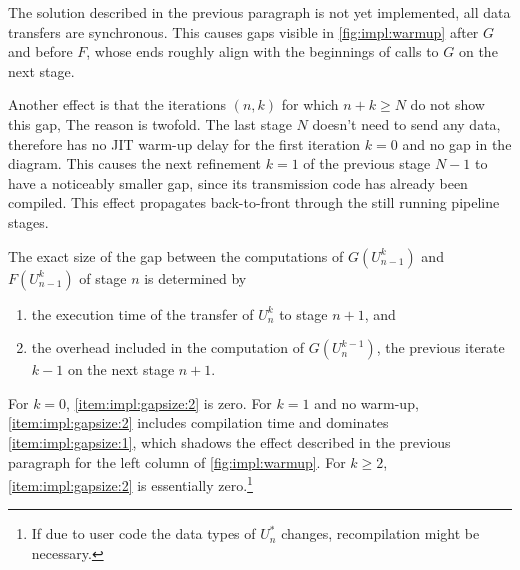 The solution described in the previous paragraph is not yet implemented,
\ie all data transfers are synchronous.
This causes gaps visible in \autoref{fig:impl:warmup} after $G$ and before $F$,
whose ends roughly align with the beginnings of calls to $G$ on the next stage.

Another effect is that the iterations $(n,k)$ for which $n+k \geq N$ do not show this gap,
The reason is twofold.
The last stage $N$ doesn't need to send any data, therefore has no \ac{JIT} warm-up delay for the first iteration $k=0$ and no gap in the diagram.
This causes the next refinement $k=1$ of the previous stage $N-1$ to have a noticeably smaller gap,
since its transmission code has already been compiled.
This effect propagates back-to-front through the still running pipeline stages.

The exact size of the gap between the computations of $G(U_{n-1}^k)$ and $F(U_{n-1}^k)$ of stage $n$ is determined by
\begin{enumerate}
  \item\label{item:impl:gapsize:1}
    the execution time of the transfer of $U_n^k$ to stage $n+1$, and
  \item\label{item:impl:gapsize:2}
    the overhead included in the computation of $G(U_n^{k-1})$,
    \ie the previous iterate $k-1$ on the next stage $n+1$.
\end{enumerate}
For $k=0$, \ref{item:impl:gapsize:2} is zero.
For $k=1$ and no warm-up, \ref{item:impl:gapsize:2} includes compilation time and dominates \ref{item:impl:gapsize:1},
which shadows the effect described in the previous paragraph for the left column of \autoref{fig:impl:warmup}.
For $k\geq 2$, \ref{item:impl:gapsize:2} is essentially zero.\footnote{%
  If due to user code the data types of $U_n^*$ changes, recompilation might be necessary.
}

